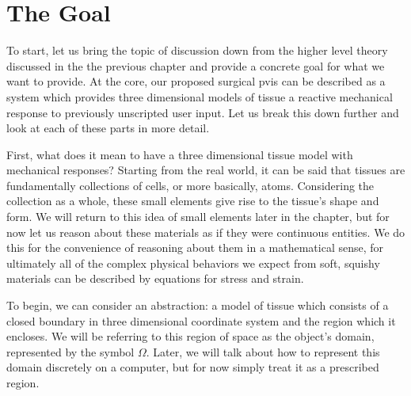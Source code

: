 \section{The Goal}

To start, let us bring the topic of discussion down from the higher
level theory discussed in the the previous chapter and provide a
concrete goal for what we want to provide. At the core, our proposed
surgical \gls{pvis} can be described as a system which provides three
dimensional models of tissue a reactive mechanical response to previously
unscripted user input. Let us break this down further and look at each
of these parts in more detail. 

First, what does it mean to have a three dimensional tissue model with
mechanical responses?  Starting from the real world, it can be said
that tissues are fundamentally collections of cells, or more
basically, atoms. Considering the collection as a whole, these small
elements give rise to the tissue's shape and form. We will return to
this idea of small elements later in the chapter, but for now let us
reason about these materials as if they were continuous entities. We
do this for the convenience of reasoning about them in a mathematical
sense, for ultimately all of the complex physical behaviors we expect
from soft, squishy materials can be described by equations for stress
and strain.

To begin, we can consider an abstraction: a model of
tissue which consists of a closed boundary in three dimensional
coordinate system and the region which it encloses. We will be
referring to this region of space as the object's domain, represented
by the symbol $\Omega$. Later, we will talk about how to represent
this domain discretely on a computer, but for now simply treat it as a
prescribed region.

